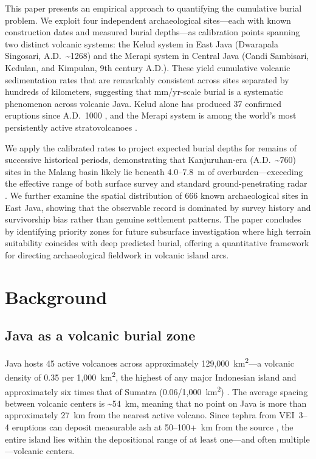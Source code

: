 \documentclass[12pt,letterpaper]{article}
\begin{document}
This paper presents an empirical approach to quantifying the cumulative burial problem. We exploit four independent archaeological sites---each with known construction dates and measured burial depths---as calibration points spanning two distinct volcanic systems: the Kelud system in East Java (Dwarapala Singosari, A.D.~\textasciitilde 1268) and the Merapi system in Central Java (Candi Sambisari, Kedulan, and Kimpulan, 9th century A.D.). These yield cumulative volcanic sedimentation rates that are remarkably consistent across sites separated by hundreds of kilometers, suggesting that mm/yr-scale burial is a systematic phenomenon across volcanic Java. Kelud alone has produced 37 confirmed eruptions since A.D.~1000 \citep{gvp2024}, and the Merapi system is among the world's most persistently active stratovolcanoes \citep{gertisser2012}.

We apply the calibrated rates to project expected burial depths for remains of successive historical periods, demonstrating that Kanjuruhan-era (A.D.~\textasciitilde 760) sites in the Malang basin likely lie beneath 4.0--7.8~m of overburden---exceeding the effective range of both surface survey and standard ground-penetrating radar \citep{putra2019}. We further examine the spatial distribution of 666 known archaeological sites in East Java, showing that the observable record is dominated by survey history and survivorship bias rather than genuine settlement patterns. The paper concludes by identifying priority zones for future subsurface investigation where high terrain suitability coincides with deep predicted burial, offering a quantitative framework for directing archaeological fieldwork in volcanic island arcs.

\section{Background}

\subsection{Java as a volcanic burial zone}

Java hosts 45 active volcanoes across approximately 129,000~km\textsuperscript{2}---a volcanic density of 0.35 per 1,000~km\textsuperscript{2}, the highest of any major Indonesian island and approximately six times that of Sumatra (0.06/1,000~km\textsuperscript{2}) \citep{vanbemmelen1949}. The average spacing between volcanic centers is \textasciitilde54~km, meaning that no point on Java is more than approximately 27~km from the nearest active volcano. Since tephra from VEI~3--4 eruptions can deposit measurable ash at 50--100+~km from the source \citep{newhall1982}, the entire island lies within the depositional range of at least one---and often multiple---volcanic centers.
\end{document}
